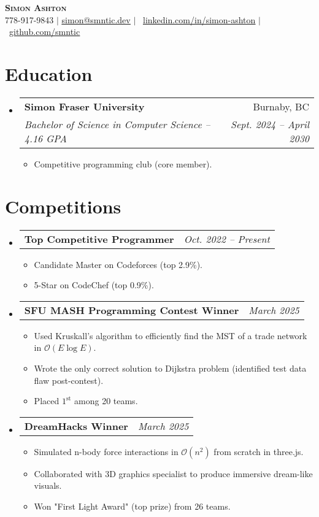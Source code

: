 \documentclass[letterpaper,11pt]{article}
\makeatletter
\newcommand{\resumeItem}[1]{
  \item\small{
    {#1 \vspace{-2pt}}
  }
}
\newcommand{\resumeSubheading}[5]{
  \vspace{-2pt}\item
    \begin{tabular*}{0.97\textwidth}[t]{l@{\extracolsep{\fill}}r}
      \textbf{#1} & #2 \\
      \textit{\small#3} & \textit{\small #4} \\
    \end{tabular*}
    \if\relax\detokenize{#5}\relax\else
      #5
    \fi
    \vspace{-7pt}
}
\newcommand{\resumeProjectHeading}[2]{
    \item
    \begin{tabular*}{0.97\textwidth}{l@{\extracolsep{\fill}}r}
      \small#1 & \textit{#2} \\
    \end{tabular*}\vspace{-7pt}
}
\newcommand{\resumeSubHeadingListStart}{\begin{itemize}[leftmargin=0.15in, label={}]}
\newcommand{\resumeSubHeadingListEnd}{\end{itemize}}
\newcommand{\resumeItemListStart}{\begin{itemize}[leftmargin=0.23in]}
\newcommand{\resumeItemListEnd}{\end{itemize}\vspace{-5pt}}
\newcommand{\bigO}{\mathcal{O}}
\makeatother
\begin{document}
\begin{center}
    \textbf{\Huge \scshape Simon Ashton} \\ \vspace{5pt}
    \small 778-917-9843 $|$ \href{mailto:simon@smntic.dev}{\underline{simon@smntic.dev}} $|$ 
    \raisebox{-0.05em}{\faLinkedin}\
    \href{https://linkedin.com/in/simon-ashton}{\underline{linkedin.com/in/simon-ashton}} $|$
    \raisebox{-0.1em}{\faGithub}\
    \href{https://github.com/smntic}{\underline{github.com/smntic}}
\end{center}


\section{Education}
  \resumeSubHeadingListStart
    \resumeSubheading
      {Simon Fraser University}{Burnaby, BC}
      {Bachelor of Science in Computer Science -- 4.16 GPA}{Sept. 2024 -- April 2030}
      \resumeItemListStart
        \resumeItem{Competitive programming club (core member).}
      \resumeItemListEnd
  \resumeSubHeadingListEnd


\section{Competitions}
    \resumeSubHeadingListStart
      \resumeProjectHeading
          {\textbf{Top Competitive Programmer}}{Oct. 2022 -- Present}
          \resumeItemListStart
            \resumeItem{Candidate Master on Codeforces (top 2.9\%).}
            \resumeItem{5-Star on CodeChef (top 0.9\%).}
          \resumeItemListEnd
      \resumeProjectHeading
          {\textbf{SFU MASH Programming Contest Winner}}{March 2025}
          \resumeItemListStart
            \resumeItem{Used Kruskall's algorithm to efficiently find the MST of a trade network in $\bigO(E \log E)$.}
            \resumeItem{Wrote the only correct solution to Dijkstra problem (identified test data flaw post-contest).}
            \resumeItem{Placed $1^\text{st}$ among 20 teams.}
          \resumeItemListEnd
      \resumeProjectHeading
          {\textbf{DreamHacks Winner}}{March 2025}
          \resumeItemListStart
            \resumeItem{Simulated n-body force interactions in $\bigO(n^2)$ from scratch in three.js.}
            \resumeItem{Collaborated with 3D graphics specialist to produce immersive dream-like visuals.}
            \resumeItem{Won "First Light Award" (top prize) from 26 teams.}
          \resumeItemListEnd
    \resumeSubHeadingListEnd
\end{document}
